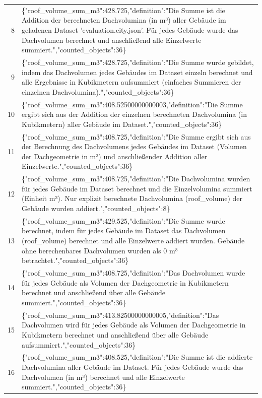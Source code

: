 \documentclass[a4paper,11pt]{article}
\begin{document}
\begin{table}[ht]
\begin{tabular}{r p{12cm}}
8 & \{"roof\_volume\_sum\_m3":428.725,"definition":"Die Summe ist die Addition der berechneten Dachvolumina (in m³) aller Gebäude im geladenen Dataset 'evaluation.city.json'. Für jedes Gebäude wurde das Dachvolumen berechnet und anschließend alle Einzelwerte summiert.","counted\_objects":36\} \\
9 & \{"roof\_volume\_sum\_m3":428.725,"definition":"Die Summe wurde gebildet, indem das Dachvolumen jedes Gebäudes im Dataset einzeln berechnet und alle Ergebnisse in Kubikmetern aufsummiert (einfaches Summieren der einzelnen Dachvolumina).","counted\_objects":36\} \\
10 & \{"roof\_volume\_sum\_m3":408.52500000000003,"definition":"Die Summe ergibt sich aus der Addition der einzelnen berechneten Dachvolumina (in Kubikmetern) aller Gebäude im Dataset.","counted\_objects":36\} \\
11 & \{"roof\_volume\_sum\_m3":408.725,"definition":"Die Summe ergibt sich aus der Berechnung des Dachvolumens jedes Gebäudes im Dataset (Volumen der Dachgeometrie in m³) und anschließender Addition aller Einzelwerte.","counted\_objects":36\} \\
12 & \{"roof\_volume\_sum\_m3":408.725,"definition":"Die Dachvolumina wurden für jedes Gebäude im Dataset berechnet und die Einzelvolumina summiert (Einheit m³). Nur explizit berechnete Dachvolumina (roof\_volume) der Gebäude wurden addiert.","counted\_objects":8\} \\
13 & \{"roof\_volume\_sum\_m3":429.525,"definition":"Die Summe wurde berechnet, indem für jedes Gebäude im Dataset das Dachvolumen (roof\_volume) berechnet und alle Einzelwerte addiert wurden. Gebäude ohne berechenbares Dachvolumen wurden als 0 m³ betrachtet.","counted\_objects":36\} \\
14 & \{"roof\_volume\_sum\_m3":408.725,"definition":"Das Dachvolumen wurde für jedes Gebäude als Volumen der Dachgeometrie in Kubikmetern berechnet und anschließend über alle Gebäude summiert.","counted\_objects":36\} \\
15 & \{"roof\_volume\_sum\_m3":413.82500000000005,"definition":"Das Dachvolumen wird für jedes Gebäude als Volumen der Dachgeometrie in Kubikmetern berechnet und anschließend über alle Gebäude aufsummiert.","counted\_objects":36\} \\
16 & \{"roof\_volume\_sum\_m3":408.525,"definition":"Die Summe ist die addierte Dachvolumina aller Gebäude im Dataset. Für jedes Gebäude wurde das Dachvolumen (in m³) berechnet und alle Einzelwerte summiert.","counted\_objects":36\} \\

\end{tabular}
\end{table}
\end{document}
